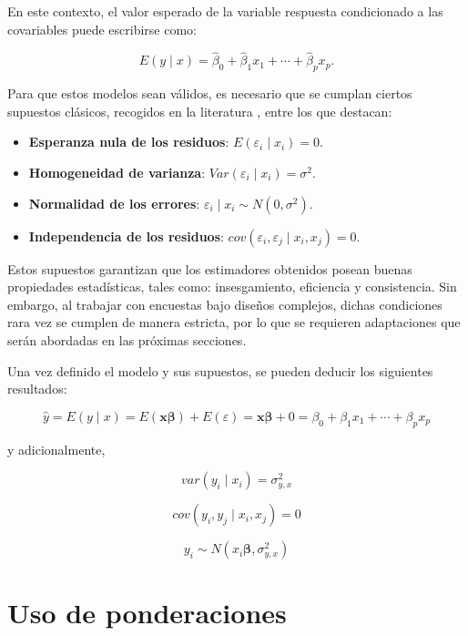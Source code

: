 \documentclass[
  spanish,
  12pt,
]{book}
\providecommand{\tightlist}{%
  \setlength{\itemsep}{0pt}\setlength{\parskip}{0pt}}
\begin{document}
En este contexto, el valor esperado de la variable respuesta condicionado a las covariables puede escribirse como:

\[
E(y \mid x) = \hat{\beta}_{0} + \hat{\beta}_{1}x_{1} + \cdots + \hat{\beta}_{p}x_{p}.
\]

Para que estos modelos sean válidos, es necesario que se cumplan ciertos supuestos clásicos, recogidos en la literatura \citep{heeringa2017applied}, entre los que destacan:

\begin{itemize}
\tightlist
\item
  \textbf{Esperanza nula de los residuos}: \(E(\varepsilon_{i} \mid x_{i}) = 0\).
\item
  \textbf{Homogeneidad de varianza}: \(Var(\varepsilon_{i} \mid x_{i}) = \sigma^2\).
\item
  \textbf{Normalidad de los errores}: \(\varepsilon_{i} \mid x_{i} \sim N(0,\sigma^2)\).
\item
  \textbf{Independencia de los residuos}: \(cov(\varepsilon_{i},\varepsilon_{j}\mid x_{i},x_{j})=0\).
\end{itemize}

Estos supuestos garantizan que los estimadores obtenidos posean buenas propiedades estadísticas, tales como: insesgamiento, eficiencia y consistencia. Sin embargo, al trabajar con encuestas bajo diseños complejos, dichas condiciones rara vez se cumplen de manera estricta, por lo que se requieren adaptaciones que serán abordadas en las próximas secciones.

Una vez definido el modelo y sus supuestos, se pueden deducir los siguientes resultados:

\[
\hat{y}  =  E\left(y\mid x\right)
 =  E\left(\boldsymbol{x}\boldsymbol{\beta}\right)+E\left(\varepsilon\right)
=  \boldsymbol{x}\boldsymbol{\beta}+0
  =  \beta_{0}+\beta_{1}x_{1}+\cdots+\beta_{p}x_{p}
\]

y adicionalmente,

\[
var\left(y_{i}\mid x_{i}\right)  =  \sigma_{y,x}^{2}
\]

\[
cov\left(y_{i},y_{j}\mid x_{i},x_{j}\right)  = 0
\]

\[
y_{i}  \sim  N\left(x_{i}\boldsymbol{\beta},\sigma_{y,x}^{2}\right)
\]

\section{Uso de ponderaciones}\label{uso-de-ponderaciones}
\end{document}
